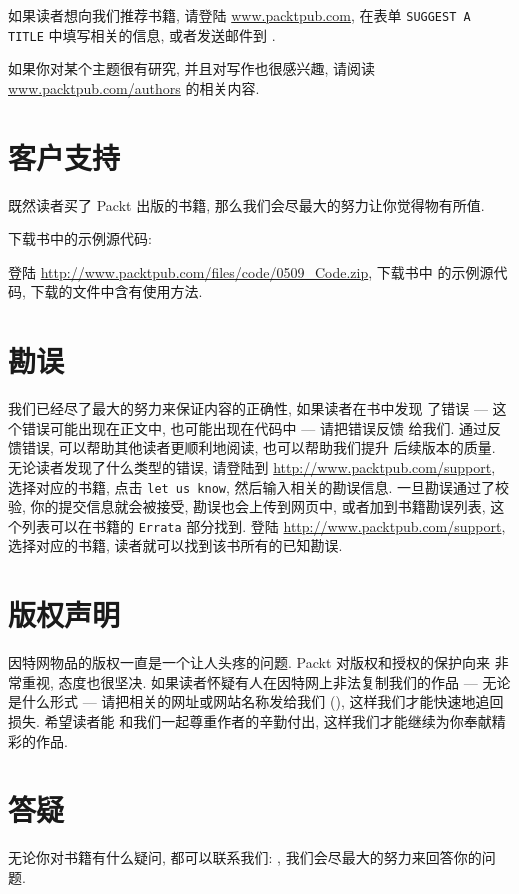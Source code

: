 如果读者想向我们推荐书籍, 请登陆 \url{www.packtpub.com}, 在表单
\texttt{SUGGEST A TITLE} 中填写相关的信息, 或者发送邮件到
.

如果你对某个主题很有研究, 并且对写作也很感兴趣, 请阅读
\url{www.packtpub.com/authors} 的相关内容.

\section*{客户支持}
\label{sec:customer_support}
既然读者买了 Packt 出版的书籍, 那么我们会尽最大的努力让你觉得物有所值.
\begin{warning}
    下载书中的示例源代码:

    登陆 \url{http://www.packtpub.com/files/code/0509_Code.zip}, 下载书中
    的示例源代码, 下载的文件中含有使用方法.
\end{warning}

\section*{勘误}
\label{sec:errata}

我们已经尽了最大的努力来保证内容的正确性, 如果读者在书中发现
了错误 --- 这个错误可能出现在正文中, 也可能出现在代码中 --- 请把错误反馈
给我们. 通过反馈错误, 可以帮助其他读者更顺利地阅读, 也可以帮助我们提升
后续版本的质量. 无论读者发现了什么类型的错误, 请登陆到
\url{http://www.packtpub.com/support}, 选择对应的书籍, 点击 \texttt{let us
know}, 然后输入相关的勘误信息. 一旦勘误通过了校验, 你的提交信息就会被接受,
勘误也会上传到网页中, 或者加到书籍勘误列表, 这个列表可以在书籍的
\texttt{Errata}
部分找到. 登陆 \url{http://www.packtpub.com/support}, 选择对应的书籍,
读者就可以找到该书所有的已知勘误.

\section*{版权声明}
\label{sec:piracy}

因特网物品的版权一直是一个让人头疼的问题. Packt 对版权和授权的保护向来
非常重视, 态度也很坚决. 如果读者怀疑有人在因特网上非法复制我们的作品 ---
无论是什么形式 --- 请把相关的网址或网站名称发给我们
(), 这样我们才能快速地追回损失. 希望读者能
和我们一起尊重作者的辛勤付出, 这样我们才能继续为你奉献精彩的作品.

\section*{答疑}
\label{sec:questions}
无论你对书籍有什么疑问, 都可以联系我们: ,
我们会尽最大的努力来回答你的问题.
